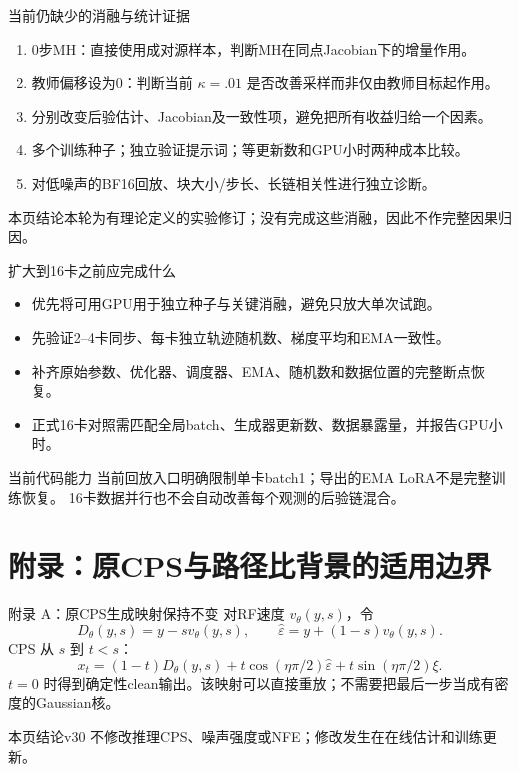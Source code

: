 \documentclass[10pt,aspectratio=169]{beamer}
\newcommand{\takeaway}[1]{\begin{exampleblock}{本页结论}\small #1\end{exampleblock}}
\begin{document}
\begin{frame}{当前仍缺少的消融与统计证据}
\small
\begin{enumerate}\itemsep5pt
\item 0步MH：直接使用成对源样本，判断MH在同点Jacobian下的增量作用。
\item 教师偏移设为0：判断当前 $\kappa=.01$ 是否改善采样而非仅由教师目标起作用。
\item 分别改变后验估计、Jacobian及一致性项，避免把所有收益归给一个因素。
\item 多个训练种子；独立验证提示词；等更新数和GPU小时两种成本比较。
\item 对低噪声的BF16回放、块大小/步长、长链相关性进行独立诊断。
\end{enumerate}
\takeaway{本轮为有理论定义的实验修订；没有完成这些消融，因此不作完整因果归因。}
\end{frame}

\begin{frame}{扩大到16卡之前应完成什么}
\small
\begin{itemize}\itemsep5pt
\item 优先将可用GPU用于独立种子与关键消融，避免只放大单次试跑。
\item 先验证2--4卡同步、每卡独立轨迹随机数、梯度平均和EMA一致性。
\item 补齐原始参数、优化器、调度器、EMA、随机数和数据位置的完整断点恢复。
\item 正式16卡对照需匹配全局batch、生成器更新数、数据暴露量，并报告GPU小时。
\end{itemize}
\begin{alertblock}{当前代码能力}
当前回放入口明确限制单卡batch1；导出的EMA LoRA不是完整训练恢复。
16卡数据并行也不会自动改善每个观测的后验链混合。
\end{alertblock}
\end{frame}

\appendix
\section{附录：原CPS与路径比背景的适用边界}
\begin{frame}{附录 A：原CPS生成映射保持不变}
\small
对RF速度 $v_\theta(y,s)$，令
\begin{equation}
D_\theta(y,s)=y-sv_\theta(y,s),\qquad
\widehat\varepsilon=y+(1-s)v_\theta(y,s).
\end{equation}
CPS 从 $s$ 到 $t<s$：
\begin{equation}
x_t=(1-t)D_\theta(y,s)+t\cos(\eta\pi/2)\widehat\varepsilon
+t\sin(\eta\pi/2)\xi.
\end{equation}
$t=0$ 时得到确定性clean输出。该映射可以直接重放；不需要把最后一步当成有密度的Gaussian核。
\takeaway{v30 不修改推理CPS、噪声强度或NFE；修改发生在在线估计和训练更新。}
\end{frame}
\end{document}
